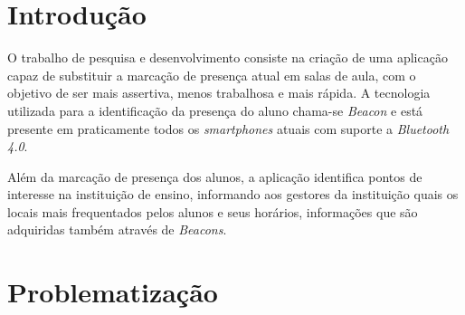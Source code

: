 \documentclass[
	12pt,
	oneside,
	a4paper,
	english,
	brazil,
]{abntex2}
\begin{document}
\frenchspacing 


\imprimircapa

\imprimirfolhaderosto


\tableofcontents*


\newpage
\textual

\chapter*[Introdução]{Introdução}

O trabalho de pesquisa e desenvolvimento consiste na criação de uma aplicação capaz de substituir a marcação de presença atual em salas de aula, com o objetivo de ser mais assertiva, menos trabalhosa e mais rápida. A tecnologia utilizada para a identificação da presença do aluno chama-se \emph{Beacon} e está presente em praticamente todos os \emph{smartphones} atuais com suporte a \emph{Bluetooth 4.0}.

Além da marcação de presença dos alunos, a aplicação identifica pontos de interesse na instituição de ensino, informando aos gestores da instituição quais os locais mais frequentados pelos alunos e seus horários, informações que são adquiridas também através de \emph{Beacons}.


\chapter{Problematização}
\end{document}
